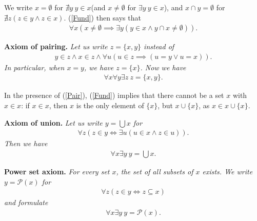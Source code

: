 \documentclass{book}
\newcommand{\titl}[1]{\noindent\textbf{#1}}
\begin{document}
We write $x=\emptyset$ for $\nexists y\ y\in x$(and $x\neq\emptyset$ for $\exists y\ y\in x$), and $x\cap y=\emptyset$ for $\nexists z(z\in y\land z\in x)$. (\ref{Fund}) then says that
    \begin{align*}
        \forall x(x\neq\emptyset\implies\exists y(y\in x\land y\cap x\neq\emptyset)).
    \end{align*}

\begin{framed}
\titl{Axiom of pairing.} \emph{Let us write $z=\{x,y\}$ instead of}
    \begin{align*}
        y\in z\land x\in z\land\forall u(u\in z\implies(u=y\lor u=x)).
    \end{align*}
\emph{In particular, when $x=y$, we have $z=\{x\}$. Now we have}
    \begin{align*}
        \forall x\forall y\exists z\ z=\{x,y\}.\tag{Pair}\label{Pair}
    \end{align*}
\end{framed}

In the presence of  (\ref{Pair}), (\ref{Fund}) implies that there cannot be a set $x$ with $x\in x$:
if $x\in x$, then $x$ is the only element of $\{x\}$, but $x\cup\{x\}$, as $x\in x\cup\{x\}$.

\begin{framed}
\titl{Axiom of union.} \emph{Let us write $y=\bigcup x$ for}
    \begin{align*}
        \forall z(z\in y\iff\exists u(u\in x\land z\in u)).
    \end{align*}
\emph{Then we have}
    \begin{align*}
        \forall x\exists y\ y=\bigcup x.\tag{Union}\label{Union}
    \end{align*}
\end{framed}

\begin{framed}
\titl{Power set axiom.} \emph{For every set $x$, the set of all subsets of $x$ exists. We write $y=\mathcal{P}(x)$ for}
    \begin{align*}
        \forall z(z\in y\iff z\subseteq x)
    \end{align*}
\emph{and formulate}
    \begin{align*}
        \forall x\exists y\ y=\mathcal{P}(x).\tag{Pow}\label{Pow}
    \end{align*}
\end{framed}
\end{document}
